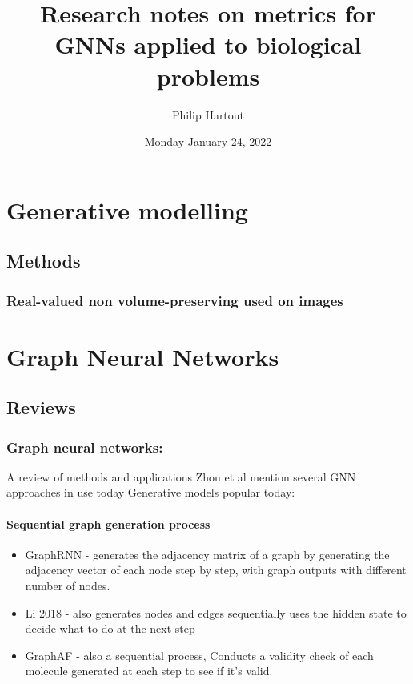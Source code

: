 \documentclass[12pt]{article}
\author{Philip Hartout}
\date{Monday January 24, 2022}
\title{Research notes on metrics for GNNs applied to biological problems}
\begin{document}
\maketitle

\section{Generative modelling}
\label{sec:orgde7dfef}
\subsection{Methods}
\label{sec:org31d8c8b}
\subsubsection{Real-valued non volume-preserving used on images}
\label{sec:orgacd366e}
\section{Graph Neural Networks}
\label{sec:org447aafb}
\subsection{Reviews}
\label{sec:orgb1a9b0e}
\subsubsection{Graph neural networks:}
\label{sec:org660f6cd}
    A review of methods and applications
Zhou et al mention several GNN approaches in use today
Generative models popular today:
\paragraph{Sequential graph generation process}
\label{sec:orgb57dbb6}
\begin{itemize}
\item GraphRNN - generates the adjacency matrix of a graph by generating the adjacency vector of each node step by step, with graph outputs with different number of nodes.
\item Li 2018 - also generates nodes and edges sequentially uses the hidden state to decide what to do at the next step
\item GraphAF - also a sequential process, Conducts a validity check of each molecule generated at each step to see if it's valid.
\end{itemize}
\end{document}
